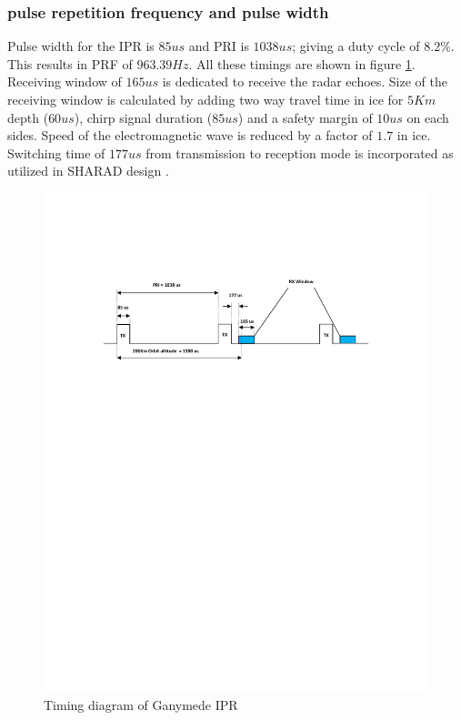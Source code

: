 \subsubsection{pulse repetition frequency and pulse width}
Pulse width for the \ac{IPR} is $85 us $ and \ac{PRI} is $1038 us$; giving a duty cycle of $8.2\% $. This results in \ac{PRF} of $963.39 Hz$. All these timings are shown in figure \ref{fig:PRI}. Receiving window of $165 us$ is dedicated to receive the radar echoes. Size of the receiving window is calculated by adding two way travel time in ice for $5 Km $ depth ($60 us$), chirp signal duration ($85 us$) and  a safety margin of $10 us$ on each sides. Speed of the electromagnetic wave is reduced by a factor of $1.7$ in ice. Switching time of $177 us$ from transmission to reception mode is incorporated as utilized in \ac{SHARAD} design \cite{SHARAD}.
%
\begin{figure}[bht]
\centering
\includegraphics[scale=1]{Figures/PRI.pdf}
\caption{Timing diagram of Ganymede \ac{IPR}} 
\label{fig:PRI}
\end{figure}
%
